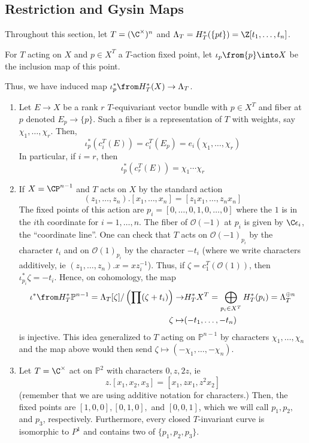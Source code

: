 \documentclass[11pt,leqno,oneside]{amsbook}
\renewcommand{\P}{\mathbb{P}}
\numberwithin{thm}{section}
\renewcommand{\O}{\mathcal{O}}
\begin{document}
\subsection{Restriction and Gysin Maps}
Throughout this section, let \(T = (\C^\times)^n\) and \(\Lambda_T =
H^*_T(\{pt\}) = \Z[t_1, \ldots, t_n]\).
\begin{defn}
  For \(T\) acting on \(X\) and \(p \in X^T\) a \(T\)-action fixed
  point, let \(\iota_p \from \{p\} \into X\) be the inclusion map of
  this point. 
\end{defn}
Thus, we have induced map \(\iota^*_p \from H_T^*(X) \to \Lambda_T\).
\begin{example}
  \label{t-equivariant-coh-of-p}
  \begin{enumerate}
  \item Let \(E \to X\) be a rank \(r\) \(T\)-equivariant vector
    bundle with \(p \in X^T\) and fiber at \(p\) denoted \(E_p \to
    \{p\}\). Such a fiber is a representation of \(T\) with weights,
    say \(\chi_1, \ldots, \chi_r\). Then, \[
      \iota^*_p(c_i^T(E)) = c_i^T(E_p) = e_i(\chi_1, \ldots, \chi_r)
    \]
    In particular, if \(i=r\), then \[
      \iota^*_p(c_r^T(E)) = \chi_1 \cdots \chi_r
    \]
  \item If \(X = \CP^{n-1}\) and \(T\) acts on \(X\) by the standard
    action \[
      (z_1, \ldots, z_n).[x_1, \ldots, x_n] = [z_1 x_1, \ldots, z_n x_n]
    \]
    The fixed points of this action are \(p_i = [0, \ldots,
    0,1,0,\ldots,0]\) where the \(1\) is in the \(i\)th coordinate for
    \(i = 1,\ldots,n\). The fiber of \(\O(-1)\) at \(p_i\) is given by
    \(\C \epsilon_i\), the ``coordinate line''. One can check that
    \(T\) acts on \(\O(-1)_{p_i}\) by the character \(t_i\) and
    on \(\O(1)_{p_i}\) by the character \(-t_i\) (where we write
    characters additively, ie \((z_1, \ldots, z_n).x = x
    z_i^{-1}\)). Thus, if \(\zeta = c_1^T(\O(1))\), then
    \(\iota^*_{p_i} \zeta = -t_i\). Hence, on cohomology, the map
    \begin{align*}
      \iota^* \from H_T^* \P^{n-1} = \Lambda_T[\zeta] / \left( \prod (\zeta+t_i) \right) \to
      & H_T^* X^T = \bigoplus_{p_i \in X^T} H_T^*(p_i) =
        \Lambda_T^{\oplus n}\\
      \zeta \mapsto & (-t_1, \ldots, -t_n)
    \end{align*}
    is injective. This idea generalized to \(T\) acting on
    \(\P^{n-1}\) by characters \(\chi_1,\ldots,\chi_n\) and the map
    above would then send \(\zeta \mapsto (-\chi_1, \ldots,
    -\chi_n)\).
  \item Let \(T = \C^\times\) act on \(\P^2\) with characters
    \(0,z,2z\), ie \[
      z.[x_1, x_2, x_3] = [x_1, zx_1, z^2 x_2]
    \]
    (remember that we are using additive notation for characters.)
    Then, the fixed points are \([1,0,0], [0,1,0],\) and
    \([0,0,1]\), which we will call \(p_1, p_2,\) and \(p_3\),
    respectively. Furthermore, every closed \(T\)-invariant curve is 
    isomorphic to \(P^1\) and contains two of \(\{p_1, p_2, p_3\}\).


\end{enumerate}
\end{example}
\end{document}
